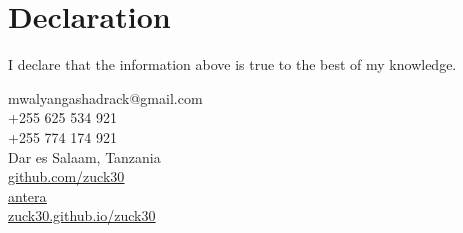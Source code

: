 \documentclass[12pt]{article}
\newcommand{\hlink}[2]{\href{#1}{\textcolor{linkblue}{\underline{#2}}}}
\begin{document}
\section*{Declaration}
\noindent I declare that the information above is true to the best of my knowledge.

\vspace{10pt}
\noindent mwalyangashadrack@gmail.com \\
+255 625 534 921 \\
+255 774 174 921 \\
Dar es Salaam, Tanzania \\
\hlink{https://github.com/zuck30}{github.com/zuck30} \\
\hlink{https://antera.co.tz}{antera} \\
\hlink{https://zuck30.github.io/zuck30}{zuck30.github.io/zuck30}
\end{document}
